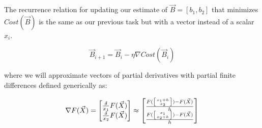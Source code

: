 \begin{fullwidth}

The recurrence relation for updating our estimate of $\vec{B}=[b_1, b_2]$ that minimizes $Cost(\vec{B})$ is the same as our previous task but with a vector instead of a scalar $x_i$.

\[
\vec{B}_{i+1} = \vec{B}_i - \eta \nabla Cost(\vec{B}_i)
\]

\noindent where we will approximate vectors of partial derivatives with partial finite differences defined generically as:

\[
\nabla F(\vec{X}) =
\begin{bmatrix}
\frac{\delta}{x_1}{F(\vec{X})}\\
\frac{\delta}{x_2}{F(\vec{X})} \\
\end{bmatrix}
\approx
\begin{bmatrix}
\frac{F(\left[ x_1+h \above 0pt{x_2} \right]) - F(\vec{X})}{h} \\
\frac{F(\left[ x_1 \above 0pt{x_2+h} \right]) - F(\vec{X})}{h} \\
\end{bmatrix}
\]


\end{fullwidth}
